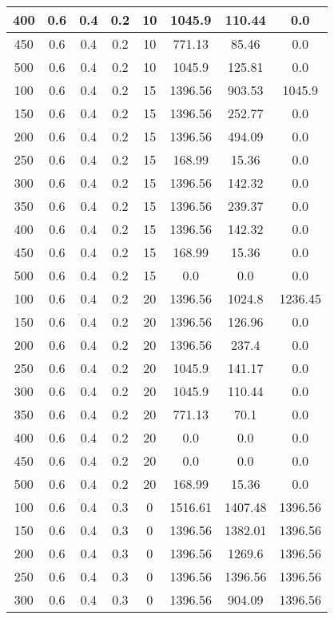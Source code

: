 \documentclass[a4paper, 12pt]{extreport}
\begin{document}
\begin{itemize}
\begin{longtable}{|c|c|c|c|c|c|c|c|}
			400 & 0.6 & 0.4 & 0.2 & 10 & 1045.9 & 110.44 & 0.0 \\\hline
			450 & 0.6 & 0.4 & 0.2 & 10 & 771.13 & 85.46 & 0.0 \\\hline
			500 & 0.6 & 0.4 & 0.2 & 10 & 1045.9 & 125.81 & 0.0 \\\hline
			100 & 0.6 & 0.4 & 0.2 & 15 & 1396.56 & 903.53 & 1045.9 \\\hline
			150 & 0.6 & 0.4 & 0.2 & 15 & 1396.56 & 252.77 & 0.0 \\\hline
			200 & 0.6 & 0.4 & 0.2 & 15 & 1396.56 & 494.09 & 0.0 \\\hline
			250 & 0.6 & 0.4 & 0.2 & 15 & 168.99 & 15.36 & 0.0 \\\hline
			300 & 0.6 & 0.4 & 0.2 & 15 & 1396.56 & 142.32 & 0.0 \\\hline
			350 & 0.6 & 0.4 & 0.2 & 15 & 1396.56 & 239.37 & 0.0 \\\hline
			400 & 0.6 & 0.4 & 0.2 & 15 & 1396.56 & 142.32 & 0.0 \\\hline
			450 & 0.6 & 0.4 & 0.2 & 15 & 168.99 & 15.36 & 0.0 \\\hline
			500 & 0.6 & 0.4 & 0.2 & 15 & 0.0 & 0.0 & 0.0 \\\hline
			100 & 0.6 & 0.4 & 0.2 & 20 & 1396.56 & 1024.8 & 1236.45 \\\hline
			150 & 0.6 & 0.4 & 0.2 & 20 & 1396.56 & 126.96 & 0.0 \\\hline
			200 & 0.6 & 0.4 & 0.2 & 20 & 1396.56 & 237.4 & 0.0 \\\hline
			250 & 0.6 & 0.4 & 0.2 & 20 & 1045.9 & 141.17 & 0.0 \\\hline
			300 & 0.6 & 0.4 & 0.2 & 20 & 1045.9 & 110.44 & 0.0 \\\hline
			350 & 0.6 & 0.4 & 0.2 & 20 & 771.13 & 70.1 & 0.0 \\\hline
			400 & 0.6 & 0.4 & 0.2 & 20 & 0.0 & 0.0 & 0.0 \\\hline
			450 & 0.6 & 0.4 & 0.2 & 20 & 0.0 & 0.0 & 0.0 \\\hline
			500 & 0.6 & 0.4 & 0.2 & 20 & 168.99 & 15.36 & 0.0 \\\hline
			100 & 0.6 & 0.4 & 0.3 & 0 & 1516.61 & 1407.48 & 1396.56 \\\hline
			150 & 0.6 & 0.4 & 0.3 & 0 & 1396.56 & 1382.01 & 1396.56 \\\hline
			200 & 0.6 & 0.4 & 0.3 & 0 & 1396.56 & 1269.6 & 1396.56 \\\hline
			250 & 0.6 & 0.4 & 0.3 & 0 & 1396.56 & 1396.56 & 1396.56 \\\hline
			300 & 0.6 & 0.4 & 0.3 & 0 & 1396.56 & 904.09 & 1396.56 \\\hline

\end{longtable}
\end{itemize}
\end{document}
